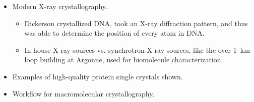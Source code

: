 \documentclass[../notes.tex]{subfiles}
\begin{document}
\begin{itemize}
\begin{itemize}
\begin{itemize}
            \begin{itemize}
                \item \SI{9.6}{\angstrom}: Radius of an $\alpha$-helix;
                \item \SI{4.6}{\angstrom}: The distance between hydrogen-bonded strands in a $\beta$-pleated sheet.
            \end{itemize}
            \item This is what made Pauling a great chemist.
        \end{itemize}
        \item Rosalind Franklin's photograph 51. \SI{3.4}{\angstrom} corresponds to the stacking between the bases.
        \begin{itemize}
            \item UChicago has a graduate course dedicated to interpreting X-ray diffraction patterns.
            \item Zhao recommends we read Watson and Crick's original 1953 paper: "Molecular Structure of Nucleic Acids: A structure for Deoxyribose Nucleic Acid."
            \item Dickerson in 1980: Crystal structure analysis of a complete turn of B-DNA.
            \item Review by Eisenberg in 2003: The discovery of the $\alpha$-helix and $\beta$-sheet, the principal structural features of proteins.
            \begin{itemize}
                \item Eisenberg was Zhao's grad mentor.
            \end{itemize}
        \end{itemize}
    \end{itemize}
    \item Modern X-ray crystallography.
    \begin{itemize}
        \item Dickerson crystallized DNA, took an X-ray diffraction pattern, and thus was able to determine the position of every atom in DNA.
        \item In-house X-ray sources vs. synchrotron X-ray sources, like the over \SI{1}{\kilo\meter} loop building at Argonne, used for biomolecule characterization.
    \end{itemize}
    \item Examples of high-quality protein single crystals shown.
    \item Workflow for macromolecular crystallography.
    \begin{itemize}

\end{itemize}
\end{itemize}
\end{document}
